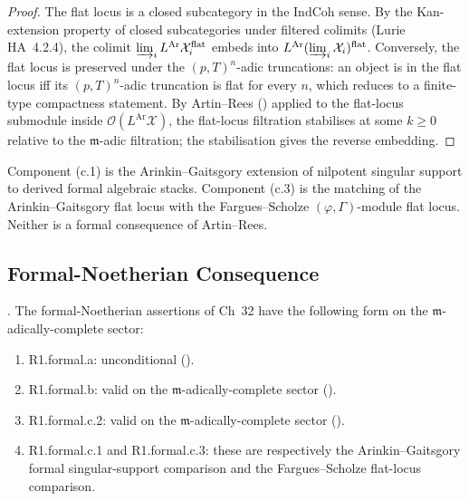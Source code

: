 \begin{proof}
The flat locus is a closed subcategory in the \(\mathrm{IndCoh}\)
sense. By the Kan-extension property of closed subcategories under
filtered colimits (Lurie HA~4.2.4), the colimit
\(\varinjlim_{i}L^{\mathrm{Ar}}\mathcal{X}_{i}^{\mathrm{flat}}\)
embeds into \(L^{\mathrm{Ar}}(\varinjlim_{i}\mathcal{X}_{i})^{\mathrm{flat}}\).
Conversely, the flat locus is preserved under the \((p,T)^{n}\)-adic
truncations: an object is in the flat locus iff its
\((p,T)^{n}\)-adic truncation is flat for every \(n\), which reduces to
a finite-type compactness statement. By Artin--Rees
() applied to the flat-locus
submodule inside \(\mathcal{O}(L^{\mathrm{Ar}}\mathcal{X})\), the
flat-locus filtration stabilises at some \(k\geq 0\) relative to the
\(\mathfrak{m}\)-adic filtration; the stabilisation gives the reverse
embedding.
\end{proof}

\begin{remark}
\label{v4-arith:w5-i:rem:c1-c3-open}
Component (c.1) is the Arinkin--Gaitsgory extension of nilpotent
singular support to derived formal algebraic stacks. Component (c.3)
is the matching of the Arinkin--Gaitsgory flat locus with the
Fargues--Scholze \((\varphi,\Gamma)\)-module flat locus. Neither is a
formal consequence of Artin--Rees.
\end{remark}

\subsection{Formal-Noetherian Consequence}
\label{v4-arith:w5-i:formal-conclusion}

\begin{theorem}
\label{v4-arith:w5-i:thm:formal-summary}
\ClaimStatusProvedHere. The formal-Noetherian assertions of
Ch~32 have the following form on the
\(\mathfrak{m}\)-adically-complete sector:
\begin{enumerate}
\item R1.formal.a: unconditional
().
\item R1.formal.b: valid on the
\(\mathfrak{m}\)-adically-complete sector
().
\item R1.formal.c.2: valid on the
\(\mathfrak{m}\)-adically-complete sector
().
\item R1.formal.c.1 and R1.formal.c.3: these are respectively the
Arinkin--Gaitsgory formal singular-support comparison and the
Fargues--Scholze flat-locus comparison.
\end{enumerate}
\end{theorem}

